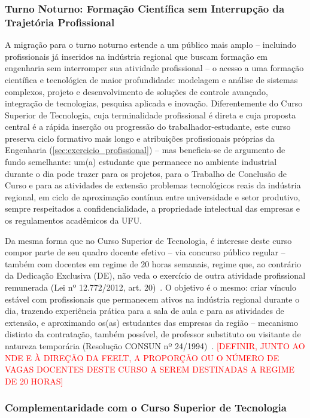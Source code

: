 \subsubsection{Turno Noturno: Formação Científica sem Interrupção da Trajetória Profissional}

A migração para o turno noturno estende a um público mais amplo -- incluindo profissionais já inseridos na indústria regional que buscam formação em engenharia sem interromper sua atividade profissional -- o acesso a uma formação científica e tecnológica de maior profundidade: modelagem e análise de sistemas complexos, projeto e desenvolvimento de soluções de controle avançado, integração de tecnologias, pesquisa aplicada e inovação. Diferentemente do Curso Superior de Tecnologia, cuja terminalidade profissional é direta e cuja proposta central é a rápida inserção ou progressão do trabalhador-estudante, este curso preserva ciclo formativo mais longo e atribuições profissionais próprias da Engenharia (\autoref{sec:exercicio_profissional}) -- mas beneficia-se de argumento de fundo semelhante: um(a) estudante que permanece no ambiente industrial durante o dia pode trazer para os projetos, para o Trabalho de Conclusão de Curso e para as atividades de extensão problemas tecnológicos reais da indústria regional, em ciclo de aproximação contínua entre universidade e setor produtivo, sempre respeitados a confidencialidade, a propriedade intelectual das empresas e os regulamentos acadêmicos da UFU.

Da mesma forma que no Curso Superior de Tecnologia, é interesse deste curso compor parte de seu quadro docente efetivo -- via concurso público regular -- também com docentes em regime de 20 horas semanais, regime que, ao contrário da Dedicação Exclusiva (DE), não veda o exercício de outra atividade profissional remunerada (Lei nº 12.772/2012, art. 20)~\cite{lei_12772_2012,ufu_progep_regime_trabalho}. O objetivo é o mesmo: criar vínculo estável com profissionais que permanecem ativos na indústria regional durante o dia, trazendo experiência prática para a sala de aula e para as atividades de extensão, e aproximando os(as) estudantes das empresas da região -- mecanismo distinto da contratação, também possível, de professor substituto ou visitante de natureza temporária (Resolução CONSUN nº 24/1994)~\cite{ufu_consun_24_1994}. \textcolor{red}{[DEFINIR, JUNTO AO NDE E À DIREÇÃO DA FEELT, A PROPORÇÃO OU O NÚMERO DE VAGAS DOCENTES DESTE CURSO A SEREM DESTINADAS A REGIME DE 20 HORAS]}

\subsubsection{Complementaridade com o Curso Superior de Tecnologia}

